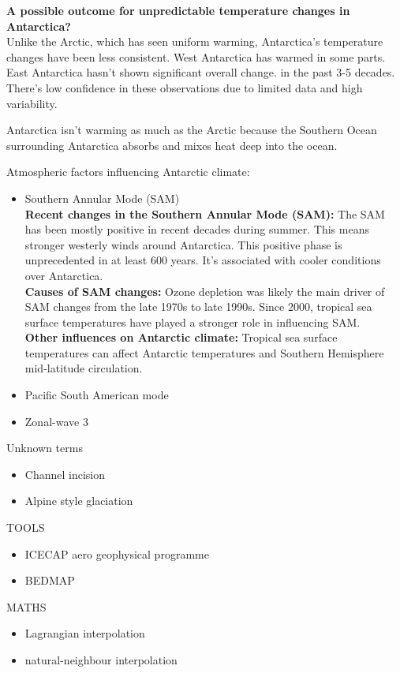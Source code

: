 \textbf{A possible outcome for unpredictable temperature changes in Antarctica?}\\
Unlike the Arctic, which has seen uniform warming, Antarctica's temperature changes have been less consistent. West Antarctica has warmed in some parts. East Antarctica hasn't shown significant overall change. in the past 3-5 decades. There's low confidence in these observations due to limited data and high variability.

Antarctica isn't warming as much as the Arctic because the Southern Ocean surrounding Antarctica absorbs and mixes heat deep into the ocean\cite{L_T_C_C}.

Atmospheric factors influencing Antarctic climate\cite{O_C_in_changingClimate}:
\begin{itemize}
\item Southern Annular Mode (SAM)\\
    \textbf{Recent changes in the Southern Annular Mode (SAM):} The SAM has been mostly positive in recent decades during summer. This means stronger westerly winds around Antarctica. This positive phase is unprecedented in at least 600 years. It's associated with cooler conditions over Antarctica.\\
    \textbf{Causes of SAM changes:} Ozone depletion was likely the main driver of SAM changes from the late 1970s to late 1990s. Since 2000, tropical sea surface temperatures have played a stronger role in influencing SAM.\\
    \textbf{Other influences on Antarctic climate:} Tropical sea surface temperatures can affect Antarctic temperatures and Southern Hemisphere mid-latitude circulation\cite{JACOBS_2004}.
\item Pacific South American mode
\item Zonal-wave 3
\end{itemize}






Unknown terms
{\small \begin{itemize}
\item{Channel incision}
\item{Alpine style glaciation}
\end{itemize}
}
\vspace{1cm}
TOOLS
{\small \begin{itemize}
\item{ICECAP aero geophysical programme}
\item{BEDMAP}
\end{itemize}
}
\vspace{1cm}
MATHS
{\small \begin{itemize}
\item{Lagrangian interpolation}
\item{natural-neighbour interpolation}
\end{itemize}
}

